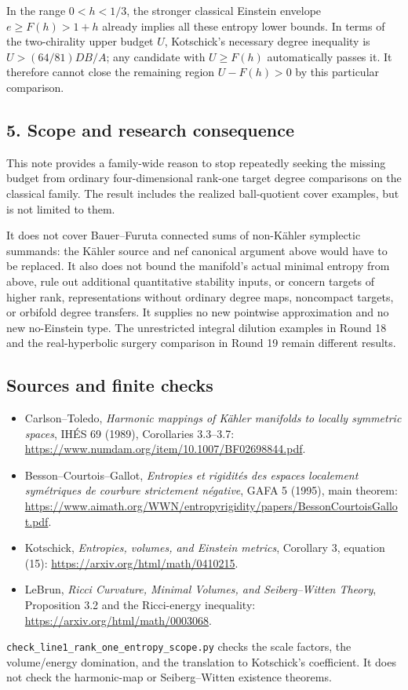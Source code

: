 \documentclass[
  11pt,
]{article}
\providecommand{\tightlist}{%
  \setlength{\itemsep}{0pt}\setlength{\parskip}{0pt}}
\begin{document}
In the range \(0<h<1/3\), the stronger classical Einstein envelope
\(e\ge F(h)>1+h\) already implies all these entropy lower bounds. In
terms of the two-chirality upper budget \(U\), Kotschick's necessary
degree inequality is \(U>(64/81)DB/A\); any candidate with \(U\ge F(h)\)
automatically passes it. It therefore cannot close the remaining region
\(U-F(h)>0\) by this particular comparison.

\hypertarget{scope-and-research-consequence}{%
\subsection{5. Scope and research
consequence}\label{scope-and-research-consequence}}

This note provides a family-wide reason to stop repeatedly seeking the
missing budget from ordinary four-dimensional rank-one target degree
comparisons on the classical family. The result includes the realized
ball-quotient cover examples, but is not limited to them.

It does not cover Bauer--Furuta connected sums of non-Kähler symplectic
summands: the Kähler source and nef canonical argument above would have
to be replaced. It also does not bound the manifold's actual minimal
entropy from above, rule out additional quantitative stability inputs,
or concern targets of higher rank, representations without ordinary
degree maps, noncompact targets, or orbifold degree transfers. It
supplies no new pointwise approximation and no new no-Einstein type. The
unrestricted integral dilution examples in Round 18 and the
real-hyperbolic surgery comparison in Round 19 remain different results.

\hypertarget{sources-and-finite-checks}{%
\subsection{Sources and finite checks}\label{sources-and-finite-checks}}

\begin{itemize}
\tightlist
\item
  Carlson--Toledo, \emph{Harmonic mappings of Kähler manifolds to
  locally symmetric spaces}, IHÉS 69 (1989), Corollaries 3.3--3.7:
  \url{https://www.numdam.org/item/10.1007/BF02698844.pdf}.
\item
  Besson--Courtois--Gallot, \emph{Entropies et rigidités des espaces
  localement symétriques de courbure strictement négative}, GAFA 5
  (1995), main theorem:
  \url{https://www.aimath.org/WWN/entropyrigidity/papers/BessonCourtoisGallot.pdf}.
\item
  Kotschick, \emph{Entropies, volumes, and Einstein metrics}, Corollary
  3, equation (15): \url{https://arxiv.org/html/math/0410215}.
\item
  LeBrun, \emph{Ricci Curvature, Minimal Volumes, and Seiberg--Witten
  Theory}, Proposition 3.2 and the Ricci-energy inequality:
  \url{https://arxiv.org/html/math/0003068}.
\end{itemize}

\texttt{check\_line1\_rank\_one\_entropy\_scope.py} checks the scale
factors, the volume/energy domination, and the translation to
Kotschick's coefficient. It does not check the harmonic-map or
Seiberg--Witten existence theorems.
\end{document}
